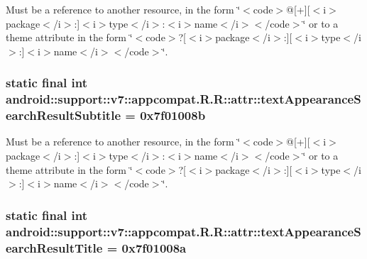 Must be a reference to another resource, in the form \char`\"{}$<$code$>$@\mbox{[}+\mbox{]}\mbox{[}$<$i$>$package$<$/i$>$:\mbox{]}$<$i$>$type$<$/i$>$:$<$i$>$name$<$/i$>$$<$/code$>$\char`\"{} or to a theme attribute in the form \char`\"{}$<$code$>$?\mbox{[}$<$i$>$package$<$/i$>$:\mbox{]}\mbox{[}$<$i$>$type$<$/i$>$:\mbox{]}$<$i$>$name$<$/i$>$$<$/code$>$\char`\"{}. \hypertarget{classandroid_1_1support_1_1v7_1_1appcompat_1_1_r_1_1attr_786449180d399c63af8eb00c9872a48a}{
\subsubsection[{textAppearanceSearchResultSubtitle}]{\setlength{\rightskip}{0pt plus 5cm}static final int android::support::v7::appcompat.R.R::attr::textAppearanceSearchResultSubtitle = 0x7f01008b}}
\label{classandroid_1_1support_1_1v7_1_1appcompat_1_1_r_1_1attr_786449180d399c63af8eb00c9872a48a}


Must be a reference to another resource, in the form \char`\"{}$<$code$>$@\mbox{[}+\mbox{]}\mbox{[}$<$i$>$package$<$/i$>$:\mbox{]}$<$i$>$type$<$/i$>$:$<$i$>$name$<$/i$>$$<$/code$>$\char`\"{} or to a theme attribute in the form \char`\"{}$<$code$>$?\mbox{[}$<$i$>$package$<$/i$>$:\mbox{]}\mbox{[}$<$i$>$type$<$/i$>$:\mbox{]}$<$i$>$name$<$/i$>$$<$/code$>$\char`\"{}. \hypertarget{classandroid_1_1support_1_1v7_1_1appcompat_1_1_r_1_1attr_89c538c69f107212dd2d48c15c530b60}{
\subsubsection[{textAppearanceSearchResultTitle}]{\setlength{\rightskip}{0pt plus 5cm}static final int android::support::v7::appcompat.R.R::attr::textAppearanceSearchResultTitle = 0x7f01008a}}
\label{classandroid_1_1support_1_1v7_1_1appcompat_1_1_r_1_1attr_89c538c69f107212dd2d48c15c530b60}


